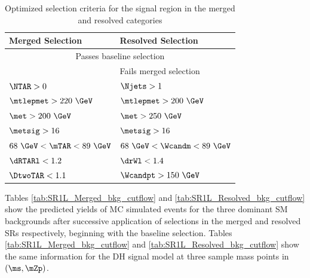 \begin{table}[htbp]
  \centering
  \caption{Optimized selection criteria for the signal region in the merged and resolved categories}
  \label{tab:SR_selection_opt}
  \begin{tabular}{l|l}
    \toprule
    \textbf{Merged Selection}  &  \textbf{Resolved Selection}  \\
    \midrule
    \midrule
    \multicolumn{2}{c}{Passes baseline selection} \\
     & Fails merged selection \\
    \(\NTAR>0\) & \(\Njets > 1\)  \\
    \(\mtlepmet>220~\GeV\) & \(\mtlepmet>200~\GeV\)\\
    \(\met>200~\GeV\) & \(\met>250~\GeV\)\\    
    \(\metsig>16\) & \(\metsig > 16\) \\
    \(68~\GeV < \mTAR < 89~\GeV\) & \(68~\GeV < \Wcandm < 89~\GeV\) \\
    \(\dRTARl<1.2\) &  \(\drWl  < 1.4\) \\
    \(\DtwoTAR<1.1\) &   \(\Wcandpt > 150~\GeV\) \\
    \bottomrule
  \end{tabular}
\end{table}

Tables \ref{tab:SR1L_Merged_bkg_cutflow} and  \ref{tab:SR1L_Resolved_bkg_cutflow} show the predicted yields of MC simulated events for the three dominant SM backgrounds after successive application of selections in the merged and resolved SRs respectively, beginning with the baseline selection. Tables \ref{tab:SR1L_Merged_bkg_cutflow} and  \ref{tab:SR1L_Resolved_bkg_cutflow} show the same information for the DH signal model at three sample mass points in \((\ms, \mZp)\).

